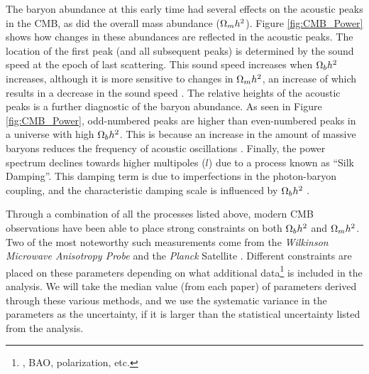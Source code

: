 The baryon abundance at this early time had several effects on the
acoustic peaks in the CMB, as did the overall mass abundance ($\Omega_m
h^2$). Figure \ref{fig:CMB_Power} shows how changes in these
abundances are reflected in the acoustic peaks. The location of the
first peak (and all subsequent peaks) is determined by the sound speed
at the epoch of last scattering. This sound speed increases when
$\Omega_b h^2$ increases, although it is more sensitive to changes in $\Omega_m
h^2$, an increase of which results in a decrease in the sound speed
\citep[][ch.~9.8]{Mukhanov2005}. The relative heights of the acoustic
peaks is a further diagnostic of the baryon abundance. As seen in
Figure \ref{fig:CMB_Power}, odd-numbered peaks are higher than
even-numbered peaks in a universe with high $\Omega_b h^2$. This is
because an increase in the amount of massive baryons reduces the
frequency of acoustic oscillations
\citep[][ch.~8.7.3]{Dodelson2003}. Finally, the power spectrum
declines towards higher multipoles ($l$) due to a process known as
``Silk Damping''. This damping term is due to imperfections in the
photon-baryon coupling, and the characteristic damping scale is
influenced by $\Omega_b h^2$ \citep[][ch.~4.7]{Durrer2008}.

Through a combination of all the processes listed above, modern CMB
observations have been able to place strong constraints on both
$\Omega_b h^2$ and $\Omega_m h^2$. Two of the most noteworthy such
measurements come from the \textit{Wilkinson Microwave Anisotropy
  Probe} \citep[\WMAP{},][]{Bennett2003} and the \textit{Planck} Satellite
\citep{PlanckResultsI}. Different constraints are placed on these
parameters depending on what additional data\footnote{\Ho, BAO,
  polarization, etc.} is included in the analysis. We will take the
median value (from each paper) of parameters derived through these
various methods, and we use the systematic variance in the parameters as
the uncertainty, if it is larger than the statistical uncertainty
listed from the analysis.

